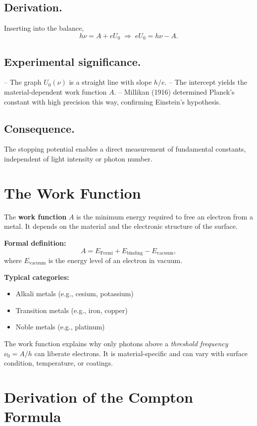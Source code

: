 \subsection*{Derivation.}
Inserting into the balance,
\[
h\nu = A + eU_0 \;\Rightarrow\;
eU_0 = h\nu - A.
\]

\subsection*{Experimental significance.}
– The graph \(U_0(\nu)\) is a straight line with slope \(h/e\).  
– The intercept yields the material-dependent work function \(A\).  
– Millikan (1916) determined Planck’s constant with high precision this way, confirming Einstein’s hypothesis.

\subsection*{Consequence.}
The stopping potential enables a direct measurement of fundamental constants, independent of light intensity or photon number.

\section{The Work Function}
\label{anhangA:austrittsarbeit}

The \textbf{work function} \( A \) is the minimum energy required to free an electron from a metal. 
It depends on the material and the electronic structure of the surface. 

\textbf{Formal definition:}
\[
A = E_{\text{Fermi}} + E_{\text{binding}} - E_{\text{vacuum}},
\]
where \( E_{\text{vacuum}} \) is the energy level of an electron in vacuum.

\textbf{Typical categories:}
\begin{itemize}
	\item Alkali metals (e.g., cesium, potassium)
	\item Transition metals (e.g., iron, copper)
	\item Noble metals (e.g., platinum)
\end{itemize}

The work function explains why only photons above a \emph{threshold frequency} \( \nu_0 = A/h \) can liberate electrons. 
It is material-specific and can vary with surface condition, temperature, or coatings.

\section{Derivation of the Compton Formula}
\label{anhangA:comptonHerleitung}

